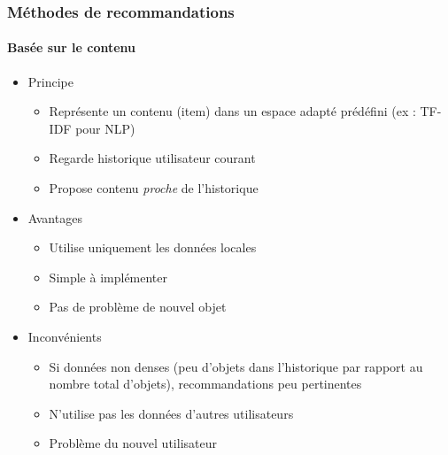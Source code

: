 \documentclass[a4,11pt,sans]{beamer}
\begin{document}
    \begin{frame}
        \frametitle{M\'ethodes de recommandations}
        \framesubtitle{Bas\'ee sur le contenu}

        \begin{itemize}
            \item Principe
                \begin{itemize}
                    \item Repr\'esente un contenu (item) dans un espace adapt\'e
                        pr\'ed\'efini (ex : TF-IDF pour NLP)
                    \item Regarde historique utilisateur courant
                    \item Propose contenu \emph{proche} de l'historique
                \end{itemize}
            \item Avantages
                \begin{itemize}
                    \item Utilise uniquement les donn\'ees locales
                    \item Simple à impl\'ementer
                    \item Pas de problème de nouvel objet
                \end{itemize}
            \item Inconv\'enients
                \begin{itemize}
                    \item Si donn\'ees non denses (peu d'objets
                        dans l'historique par rapport au nombre total
                        d'objets), recommandations peu pertinentes
                    \item N'utilise pas les donn\'ees d'autres utilisateurs
                    \item Problème du nouvel utilisateur
                \end{itemize}
        \end{itemize}
    \end{frame}
\end{document}
